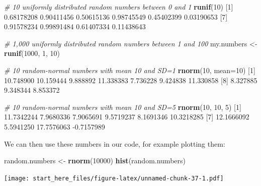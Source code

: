 \documentclass[]{article}
\newenvironment{Shaded}{\begin{snugshade}}{\end{snugshade}}
\newcommand{\CommentTok}[1]{\textcolor[rgb]{0.56,0.35,0.01}{\textit{#1}}}
\newcommand{\DataTypeTok}[1]{\textcolor[rgb]{0.13,0.29,0.53}{#1}}
\newcommand{\DecValTok}[1]{\textcolor[rgb]{0.00,0.00,0.81}{#1}}
\newcommand{\FloatTok}[1]{\textcolor[rgb]{0.00,0.00,0.81}{#1}}
\newcommand{\KeywordTok}[1]{\textcolor[rgb]{0.13,0.29,0.53}{\textbf{#1}}}
\newcommand{\NormalTok}[1]{#1}
\newcommand{\StringTok}[1]{\textcolor[rgb]{0.31,0.60,0.02}{#1}}
\begin{document}
\begin{Shaded}
\begin{Highlighting}[]
\CommentTok{# 10 uniformly distributed random numbers between 0 and 1}
\KeywordTok{runif}\NormalTok{(}\DecValTok{10}\NormalTok{)}
\NormalTok{ [}\DecValTok{1}\NormalTok{] }\FloatTok{0.68178208} \FloatTok{0.90411456} \FloatTok{0.50615136} \FloatTok{0.98745549} \FloatTok{0.45402399} \FloatTok{0.03190653}
\NormalTok{ [}\DecValTok{7}\NormalTok{] }\FloatTok{0.91578234} \FloatTok{0.99891484} \FloatTok{0.61407334} \FloatTok{0.11438643}

\CommentTok{# 1,000 uniformly distributed random numbers between 1 and 100}
\NormalTok{my.numbers <-}\StringTok{ }\KeywordTok{runif}\NormalTok{(}\DecValTok{1000}\NormalTok{, }\DecValTok{1}\NormalTok{, }\DecValTok{10}\NormalTok{)}

\CommentTok{# 10 random-normal numbers with mean 10 and SD=1}
\KeywordTok{rnorm}\NormalTok{(}\DecValTok{10}\NormalTok{, }\DataTypeTok{mean=}\DecValTok{10}\NormalTok{)}
\NormalTok{ [}\DecValTok{1}\NormalTok{] }\FloatTok{10.748900} \FloatTok{10.159444}  \FloatTok{9.888892} \FloatTok{11.338383}  \FloatTok{7.736228}  \FloatTok{9.424838} \FloatTok{11.330858}
\NormalTok{ [}\DecValTok{8}\NormalTok{]  }\FloatTok{8.327885}  \FloatTok{9.348344}  \FloatTok{8.853372}

\CommentTok{# 10 random-normal numbers with mean 10 and SD=5}
\KeywordTok{rnorm}\NormalTok{(}\DecValTok{10}\NormalTok{, }\DecValTok{10}\NormalTok{, }\DecValTok{5}\NormalTok{)}
\NormalTok{ [}\DecValTok{1}\NormalTok{] }\FloatTok{11.7342244}  \FloatTok{7.9680336}  \FloatTok{7.9065691}  \FloatTok{9.5719237}  \FloatTok{8.1691346} \FloatTok{10.3218285}
\NormalTok{ [}\DecValTok{7}\NormalTok{] }\FloatTok{12.1666092}  \FloatTok{5.5941250} \FloatTok{17.7576063} \FloatTok{-0.7157989}
\end{Highlighting}
\end{Shaded}

We can then use these numbers in our code, for example plotting them:

\begin{Shaded}
\begin{Highlighting}[]
\NormalTok{random.numbers <-}\StringTok{ }\KeywordTok{rnorm}\NormalTok{(}\DecValTok{10000}\NormalTok{)}
\KeywordTok{hist}\NormalTok{(random.numbers)}
\end{Highlighting}
\end{Shaded}

\texttt{[image: start\_here\_files/figure-latex/unnamed-chunk-37-1.pdf]}
\end{document}
